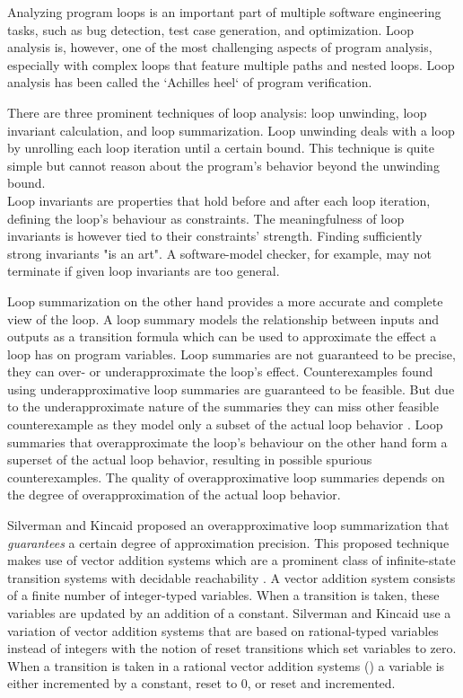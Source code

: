 Analyzing program loops is an important part of multiple software engineering tasks, such as bug detection, test case generation, and optimization. Loop analysis is, however, one of the most challenging aspects of program analysis, especially with complex loops that feature multiple paths and nested loops. Loop analysis has been called the `Achilles heel` of program verification\cite{DBLP:journals/fmsd/KroeningSTTW13}. \par
There are three prominent techniques of loop analysis: loop unwinding, loop invariant calculation, and loop summarization\cite{DBLP:journals/fmsd/KroeningSTTW13 , DBLP:conf/cav/SilvermanK19, DBLP:journals/tse/XieCZLLL19}. Loop unwinding deals with a loop by unrolling each loop iteration until a certain bound. This technique is quite simple but cannot reason about the program's behavior beyond the unwinding bound. \\
Loop invariants are properties that hold before and after each loop iteration, defining the loop's behaviour as constraints. The meaningfulness of loop invariants is however tied to their constraints' strength. Finding sufficiently strong invariants "is an art"\cite{DBLP:journals/fmsd/KroeningSTTW13}. A software-model checker, for example, may not terminate if given loop invariants are too general. \par
Loop summarization on the other hand provides a more accurate and complete view of the loop. A loop summary models the relationship between inputs and outputs as a transition formula which can be used to approximate the effect a loop has on program variables. Loop summaries are not guaranteed to be precise, they can over- or underapproximate the loop's effect. Counterexamples found using underapproximative loop summaries are guaranteed to be feasible. But due to the underapproximate nature of the summaries they can miss other feasible counterexample as they model only a subset of the actual loop behavior \cite{DBLP:journals/fmsd/KroeningLW15}. Loop summaries that overapproximate the loop's behaviour on the other hand form a superset of the actual loop behavior, resulting in possible spurious counterexamples. The quality of overapproximative loop summaries depends on the degree of overapproximation of the actual loop behavior. \par
Silverman and Kincaid\cite{DBLP:conf/cav/SilvermanK19} proposed an overapproximative loop summarization that \textsl{guarantees} a certain degree of approximation precision.
This proposed technique makes use of vector addition systems which are a prominent class of infinite-state transition systems with decidable reachability \cite{DBLP:conf/rp/HaaseH14}. A vector addition system consists of a finite number of integer-typed variables. When a transition is taken, these variables are updated by an addition of a constant. Silverman and Kincaid use a variation of vector addition systems that are based on rational-typed variables instead of integers with the notion of reset transitions which set variables to zero. When a transition is taken in a rational vector addition systems (\qvasr) a variable is either incremented by a constant, reset to 0, or reset and incremented.
